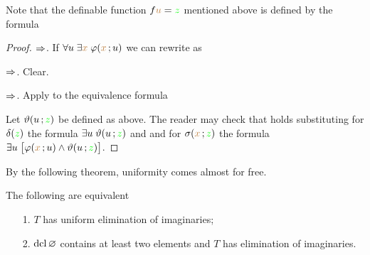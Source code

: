 \documentclass[creche.tex]{subfiles}
\begin{document}
Note that the definable function $f{\color{brown} u}={\color{green} z}$ mentioned above is defined by the formula 


\begin{proof}
$\Rightarrow$. If $\forall u\;\exists{\color{brown}x}\;\varphi({\color{brown} x}\,;u)$ we can rewrite  as 


$\Rightarrow$. Clear.

$\Rightarrow$. Apply  to the equivalence formula


Let $\vartheta(u\,;{\color{green} z})$ be defined as above. The reader may check that  holds substituting for $\delta({\color{green} z})$ the formula $\exists u\;\vartheta(u\,;{\color{green} z})$ and and for $\sigma({\color{brown} x}\,;{\color{green} z})$ the formula $\exists u\;\big[\varphi({\color{brown} x}\,;u)\wedge\vartheta(u\,;{\color{green} z})\big]$.
\end{proof}

By the following theorem, uniformity comes almost for free.

\begin{theorem}\label{thm_ei_unif} The following are equivalent
\begin{itemize}
\item[1.] $T$ has uniform elimination of imaginaries;
\item[2.] $\mathop{\rm dcl}\varnothing$ contains at least two elements and $T$ has elimination of imaginaries.
\end{itemize}
\end{theorem}

\end{document}
